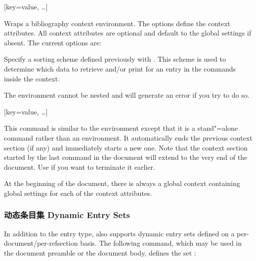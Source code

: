 \begin{ltxsyntax}

[key=value, \dots]

Wraps a bibliography context environment. The options define the context attributes. All context attributes are optional and default to the global settings if absent. The current options are:

\begin{optionlist*}


Specify a sorting scheme defined previously with . This scheme is used to determine which data to retrieve and/or print for an entry in the commands inside the context.

\end{optionlist*}
%
The  environment cannot be nested and \biblatex will generate an error if you try to do so.

[key=value, \dots]

This command is similar to the  environment except that it is a stand"=alone command rather than an environment. It automatically ends the previous context section (if any) and immediately starts a new one. Note that the context section started by the last  command in the document will extend to the very end of the document. Use  if you want to terminate it earlier.
\end{ltxsyntax}
%
At the beginning of the document, there is always a global context containing global settings for each of the context attributes.

\subsubsection{动态条目集 Dynamic Entry Sets}
\label{use:bib:set}

In addition to the  entry type, \biblatex also supports dynamic entry sets defined on a per-document\slash per-refsection basis. The following command, which may be used in the document preamble or the document body, defines the set :

